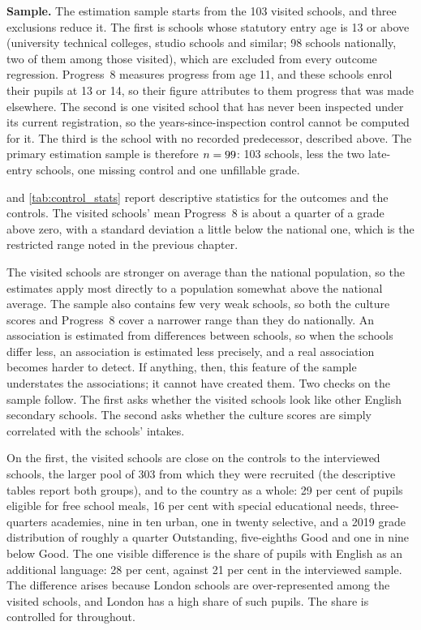 \textbf{Sample.} The estimation sample starts from the 103 visited schools, and three exclusions reduce it. The first is schools whose statutory entry age is 13 or above (university technical colleges, studio schools and
similar; 98 schools nationally, two of them among those visited), which are
excluded from every outcome regression. Progress~8 measures progress from
age 11, and these schools enrol their pupils at 13 or 14, so their figure
attributes to them progress that was made elsewhere. The second is one visited school that has never been inspected under its current registration, so the years-since-inspection control cannot be computed for it. The third is the school with no recorded predecessor, described above. The
primary estimation sample is therefore $n = 99$: 103 schools,
less the two late-entry schools, one missing control and one unfillable
grade.

and \cref{tab:control_stats} report descriptive statistics for the outcomes
and the controls. The visited schools' mean Progress~8 is about a quarter of
a grade above zero, with a standard deviation a little below the national
one, which is the restricted range noted in the previous chapter.

The visited schools are stronger on average than the national population, so the estimates apply most directly to a population somewhat above the national average. The sample also contains few very weak schools, so both the culture scores and Progress~8 cover a narrower range than they do nationally. An association is estimated from differences between schools, so when the schools differ less, an association is estimated less precisely, and a real association becomes harder to detect. If anything, then, this feature of the sample understates the associations; it cannot have created them. Two checks on the sample follow. The first asks whether the visited schools look like other English secondary schools. The second asks whether the culture scores are simply correlated with the schools' intakes.

On the first, the visited schools are close on the controls to the interviewed schools, the larger pool of 303 from which they were recruited (the descriptive tables report both groups), and to the country as a whole: 29 per cent of pupils eligible for free school meals, 16 per cent with special educational needs, three-quarters academies, nine in ten urban, one in twenty selective, and a 2019 grade distribution of roughly a quarter Outstanding, five-eighths Good and one in nine below Good. The one visible difference is the share of pupils with English as an additional language: 28 per cent, against 21 per cent in the interviewed sample. The difference arises because London schools are over-represented among the visited schools, and London has a high share of such pupils. The share is controlled for throughout.

